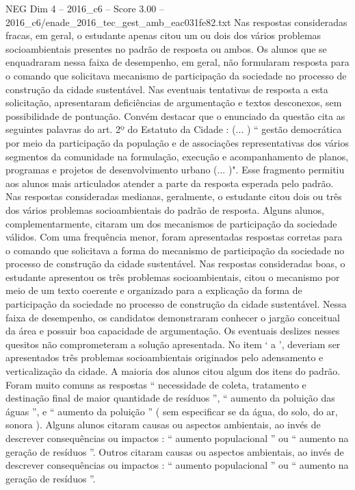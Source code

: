\begin{textsample}{NEG Dim 4 – 2016\_c6 – Score 3.00 – 2016\_c6/enade\_2016\_tec\_gest\_amb\_eac031fe82.txt}
Nas respostas consideradas fracas, em geral, o estudante apenas citou um ou dois dos vários problemas socioambientais presentes no padrão de resposta ou ambos.
Os alunos que se enquadraram nessa faixa de desempenho, em geral, não formularam resposta para o comando que solicitava mecanismo de participação da sociedade no processo de construção da cidade sustentável.
Nas eventuais tentativas de resposta a esta solicitação, apresentaram deficiências de argumentação e textos desconexos, sem possibilidade de pontuação.
Convém destacar que o enunciado da questão cita as seguintes palavras do art. 2º do Estatuto da Cidade : (... ) “ gestão democrática por meio da participação da população e de associações representativas dos vários segmentos da comunidade na formulação, execução e acompanhamento de planos, programas e projetos de desenvolvimento urbano (... )".
Esse fragmento permitiu aos alunos mais articulados atender a parte da resposta esperada pelo padrão.
Nas respostas consideradas medianas, geralmente, o estudante citou dois ou três dos vários problemas socioambientais do padrão de resposta.
Alguns alunos, complementarmente, citaram um dos mecanismos de participação da sociedade válidos.
Com uma frequência menor, foram apresentadas respostas corretas para o comando que solicitava a forma do mecanismo de participação da sociedade no processo de construção da cidade sustentável.
Nas respostas consideradas boas, o estudante apresentou os três problemas socioambientais, citou o mecanismo por meio de um texto coerente e organizado para a explicação da forma de participação da sociedade no processo de construção da cidade sustentável.
Nessa faixa de desempenho, os candidatos demonstraram conhecer o jargão conceitual da área e possuir boa capacidade de argumentação.
Os eventuais deslizes nesses quesitos não comprometeram a solução apresentada.
No item ‘ a ’, deveriam ser apresentados três problemas socioambientais originados pelo adensamento e verticalização da cidade.
A maioria dos alunos citou algum dos itens do padrão.
Foram muito comuns as respostas “ necessidade de coleta, tratamento e destinação final de maior quantidade de resíduos ”, “ aumento da poluição das águas ”, e “ aumento da poluição ” ( sem especificar se da água, do solo, do ar, sonora ).
Alguns alunos citaram causas ou aspectos ambientais, ao invés de descrever consequências ou impactos : “ aumento populacional ” ou “ aumento na geração de resíduos ”.
Outros citaram causas ou aspectos ambientais, ao invés de descrever consequências ou impactos : “ aumento populacional ” ou “ aumento na geração de resíduos ”.

\end{textsample}
